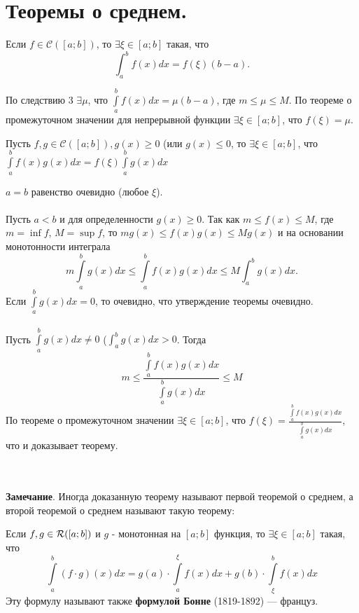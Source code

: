 \section{Теоремы о среднем.}
\begin{theorem}
	Если $f \in \mathcal{C}([a;b])$, то $\exists \xi \in [a;b]$ такая, что $$\int_a^bf(x)dx = f(\xi)(b-a).$$
\end{theorem}
\begin{Proof}
	По следствию 3 $\exists \mu$, что $\int\limits_a^bf(x)dx = \mu(b-a)$, где $m \leq \mu \leq M$. По теореме о промежуточном значении для непрерывной функции $\exists \xi \in [a;b]$, что $f(\xi) = \mu$.
\end{Proof}
\begin{theorem}
	Пусть $f, g \in \mathcal{C}([a;b]), g(x) \geq 0$ (или $g(x) \leq 0$, то $\exists \xi \in[a;b]$, что $\int\limits_a^bf(x)g(x)dx = f(\xi)\int\limits_a^b g(x)dx$
\end{theorem}
\begin{Proof}
	$a=b$ равенство очевидно (любое $\xi$).\\\\
	Пусть $a<b$ и для определенности $g(x) \geq 0$.
	Так как $m \leq f(x) \leq M$, где $m = \inf f$, $M = \sup f$, то $mg(x) \leq f(x)g(x) \leq M g(x)$ и на основании монотонности интеграла $$m \int\limits_a^b g(x)dx \leq \int\limits_a^bf(x)g(x)dx \leq M\int_a^b g(x)dx.$$
	Если $\int\limits_a^b g(x)dx = 0$, то очевидно, что утверждение теоремы очевидно.\\\\
	Пусть $\int\limits_a^b g(x)dx \neq 0$ ($\int_a^b g(x)dx > 0$. Тогда $$m \leq \frac{\int\limits_a^b f(x)g(x)dx}{\int\limits_a^b g(x)dx} \leq M$$
	По теореме о промежуточном значении $\exists \xi \in [a;b]$, что $f(\xi) = \frac{\int\limits_a^b f(x)g(x)dx}{\int\limits_a^b g(x)dx}$, что и доказывает теорему.
\end{Proof}\\\\
\textbf{Замечание}.
Иногда доказанную теорему называют первой теоремой о среднем, а второй теоремой о среднем называют такую теорему:
\begin{theorem}
	Если $f, g \in\mathcal{R}([a; b])$ и $g$ - монотонная на $[a;b]$ функция, то $\exists \xi \in [a;b]$ такая, что $$\int\limits_a^b(f\cdot g)(x)dx = g(a)\cdot \int\limits_a^{\xi}f(x)dx + g(b)\cdot \int\limits_{\xi}^bf(x)dx$$
	Эту формулу называют также \textbf{формулой Бонне} (1819-1892) --- француз.
\end{theorem}

